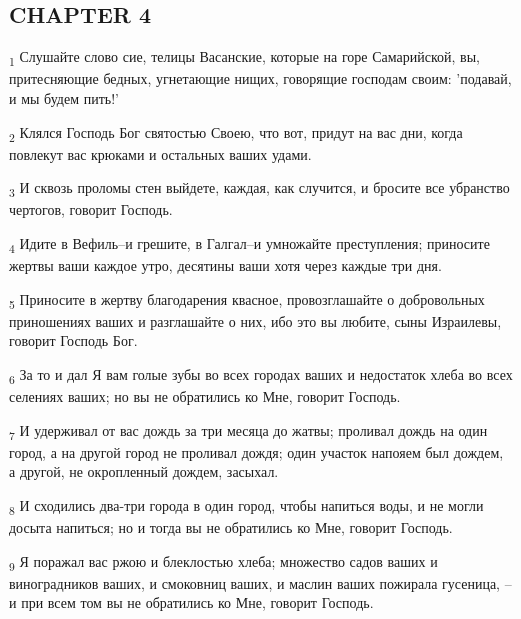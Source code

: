 \subsection{CHAPTER 4}
\begin{tcolorbox}
\textsubscript{1} Слушайте слово сие, телицы Васанские, которые на горе Самарийской, вы, притесняющие бедных, угнетающие нищих, говорящие господам своим: 'подавай, и мы будем пить!'
\end{tcolorbox}
\begin{tcolorbox}
\textsubscript{2} Клялся Господь Бог святостью Своею, что вот, придут на вас дни, когда повлекут вас крюками и остальных ваших удами.
\end{tcolorbox}
\begin{tcolorbox}
\textsubscript{3} И сквозь проломы стен выйдете, каждая, как случится, и бросите все убранство чертогов, говорит Господь.
\end{tcolorbox}
\begin{tcolorbox}
\textsubscript{4} Идите в Вефиль--и грешите, в Галгал--и умножайте преступления; приносите жертвы ваши каждое утро, десятины ваши хотя через каждые три дня.
\end{tcolorbox}
\begin{tcolorbox}
\textsubscript{5} Приносите в жертву благодарения квасное, провозглашайте о добровольных приношениях ваших и разглашайте о них, ибо это вы любите, сыны Израилевы, говорит Господь Бог.
\end{tcolorbox}
\begin{tcolorbox}
\textsubscript{6} За то и дал Я вам голые зубы во всех городах ваших и недостаток хлеба во всех селениях ваших; но вы не обратились ко Мне, говорит Господь.
\end{tcolorbox}
\begin{tcolorbox}
\textsubscript{7} И удерживал от вас дождь за три месяца до жатвы; проливал дождь на один город, а на другой город не проливал дождя; один участок напояем был дождем, а другой, не окропленный дождем, засыхал.
\end{tcolorbox}
\begin{tcolorbox}
\textsubscript{8} И сходились два-три города в один город, чтобы напиться воды, и не могли досыта напиться; но и тогда вы не обратились ко Мне, говорит Господь.
\end{tcolorbox}
\begin{tcolorbox}
\textsubscript{9} Я поражал вас ржою и блеклостью хлеба; множество садов ваших и виноградников ваших, и смоковниц ваших, и маслин ваших пожирала гусеница, --и при всем том вы не обратились ко Мне, говорит Господь.
\end{tcolorbox}
